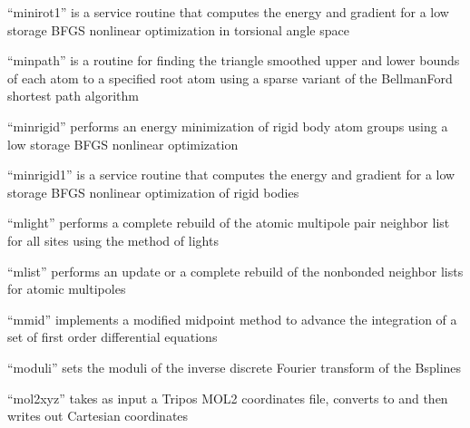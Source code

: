 \documentclass[letterpaper,11pt,english]{sphinxmanual}
\begin{document}

“minirot1” is a service routine that computes the energy
and gradient for a low storage BFGS nonlinear optimization
in torsional angle space


“minpath” is a routine for finding the triangle smoothed upper
and lower bounds of each atom to a specified root atom using a
sparse variant of the Bellman\sphinxhyphen{}Ford shortest path algorithm


“minrigid” performs an energy minimization of rigid body atom
groups using a low storage BFGS nonlinear optimization


“minrigid1” is a service routine that computes the energy
and gradient for a low storage BFGS nonlinear optimization
of rigid bodies


“mlight” performs a complete rebuild of the atomic multipole
pair neighbor list for all sites using the method of lights


“mlist” performs an update or a complete rebuild of the
nonbonded neighbor lists for atomic multipoles


“mmid” implements a modified midpoint method to advance the
integration of a set of first order differential equations







“moduli” sets the moduli of the inverse discrete Fourier
transform of the B\sphinxhyphen{}splines


“mol2xyz” takes as input a Tripos MOL2 coordinates file,
converts to and then writes out Cartesian coordinates
\end{document}
